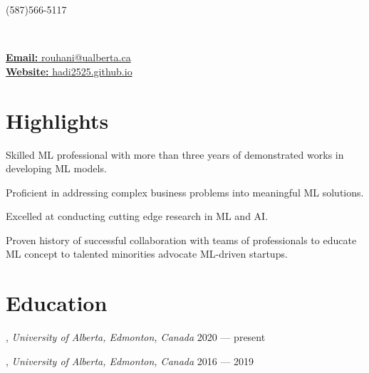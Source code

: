 \documentclass[letter,11pt]{article}
\author{Mohammad Hadi Rouhani} %
\makeatletter
\def\phone{(587)566-5117}
\def\city{}
\def\email{rouhani@ualberta.ca}
\def\Web{hadi2525.github.io}
\def\role{} %
\makeatother
\begin{document}
\begin{center}
	\begin{minipage}[b]{.3\textwidth}
		\raggedright
		{\large \phone} \\ %
		{\city} %
		
	\end{minipage}%
	\begin{minipage}[b]{.4\textwidth}
		\makeatletter
		\centering {\HUGE \@author} \\
		\makeatother
		\vspace{.5em}
		{\color{highlight} \Large{\role}}
	\end{minipage}%
	\begin{minipage}[b]{.3\textwidth}
		\raggedleft 
		\href{mailto:\email}{\textbf{Email:} \email}\\ 
		\href{https://hadi2525.github.io/\Web}{\textbf{Website:} \Web}
	\end{minipage}

\end{center}
\vspace{-1em}	
\section{Highlights}
\begin{zitemize}
	\item Skilled ML professional with more than three years of demonstrated works in developing ML models.
	\item Proficient in addressing complex business problems into meaningful ML solutions.
	\item Excelled at conducting cutting edge research in ML and AI.
	\item Proven history of successful collaboration with teams of professionals to educate ML concept to talented minorities advocate ML-driven startups.
\end{zitemize}
\section{Education}
, \textit{University of Alberta, Edmonton, Canada}	\hfill  2020 --- present

,  \textit{University of Alberta, Edmonton, Canada}	\hfill  2016 --- 2019
\end{document}
